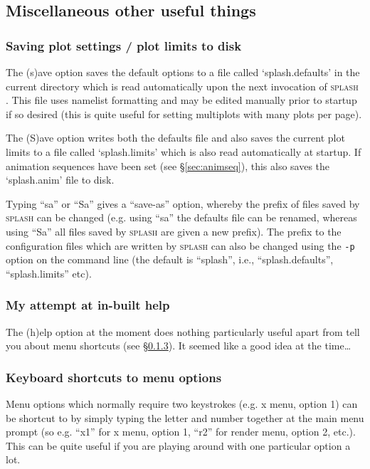 \documentclass[a4paper,10pt]{article}
\newcommand{\splash}{\textsc{splash }}
\begin{document}
\subsection{Miscellaneous other useful things}%

\subsubsection{ Saving plot settings / plot limits to disk}
 The (s)ave option saves the default options to a file called `splash.defaults' in the
current directory which is read automatically upon the next invocation of
\splash. This file uses namelist formatting and may be edited manually prior to  
startup if so desired (this is quite useful for setting multiplots with many plots per
 page).
 
  The (S)ave option writes both the defaults file and also saves the current plot
limits to a file called `splash.limits' which is also read automatically
at startup. If animation sequences have been set (see \S\ref{sec:animseq}), this also saves the `splash.anim' file to disk.

 Typing ``sa'' or ``Sa'' gives a ``save-as'' option, whereby the prefix of files saved by \splash can be changed (e.g. using ``sa'' the defaults file can be renamed, whereas using ``Sa'' all files saved by \splash are given a new prefix). The prefix to the configuration files which are written by \splash can also be changed using the \verb+-p+ option on the command line (the default is ``splash'', i.e., ``splash.defaults'', ``splash.limits'' etc).

\subsubsection{ My attempt at in-built help}
The (h)elp option at the moment does nothing particularly useful apart from tell you about menu shortcuts (see \S\ref{sec:menushortcuts}). It seemed like a good idea at the time\ldots

\subsubsection{ Keyboard shortcuts to menu options}
\label{sec:menushortcuts}
Menu options which normally require two keystrokes (e.g. x menu, option 1) can be shortcut to by simply typing the letter and number together at the main menu prompt (so e.g. ``x1'' for x menu, option 1, ``r2'' for render menu, option 2, etc.). This can be quite useful if you are playing around with one particular option a lot.
\end{document}
